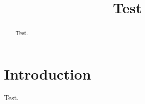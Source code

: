 \documentclass[conference]{IEEEtran}
\begin{document}
\title{Test}
\author{}
\maketitle
\begin{abstract}
Test.
\end{abstract}
\section{Introduction}
Test.
\end{document}
